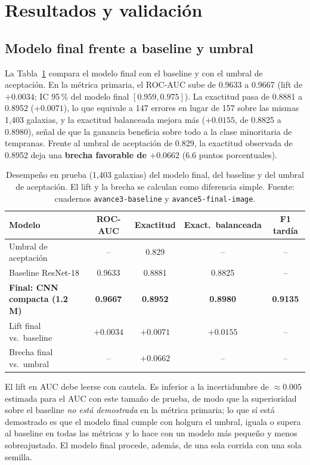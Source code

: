 \documentclass[letterpaper,11pt]{article}
\begin{document}
\section{Resultados y validación}
\label{sec:resultados}

\subsection{Modelo final frente a baseline y umbral}
La Tabla~\ref{tab:final} compara el modelo final con el baseline y con el umbral de aceptación. En la métrica primaria, el ROC-AUC sube de 0.9633 a 0.9667 (lift de $+0.0034$; IC 95\,\% del modelo final $[0.959, 0.975]$). La exactitud pasa de 0.8881 a 0.8952 ($+0.0071$), lo que equivale a 147 errores en lugar de 157 sobre las mismas 1,403 galaxias, y la exactitud balanceada mejora más ($+0.0155$, de 0.8825 a 0.8980), señal de que la ganancia beneficia sobre todo a la clase minoritaria de tempranas. Frente al umbral de aceptación de 0.829, la exactitud observada de 0.8952 deja una \textbf{brecha favorable de $+0.0662$} (6.6 puntos porcentuales).

\begin{table}[H]
  \centering
  \caption{Desempeño en prueba (1,403 galaxias) del modelo final, del baseline y del umbral de aceptación. El lift y la brecha se calculan como diferencia simple. Fuente: cuadernos \texttt{avance3-baseline} y \texttt{avance5-final-image}.}
  \label{tab:final}
  \begin{tabular}{lcccc}
    \toprule
    Modelo & ROC-AUC & Exactitud & Exact.\ balanceada & F1 tardía \\
    \midrule
    Umbral de aceptación & -- & 0.829 & -- & -- \\
    Baseline ResNet-18 & 0.9633 & 0.8881 & 0.8825 & -- \\
    \textbf{Final: CNN compacta (1.2 M)} & \textbf{0.9667} & \textbf{0.8952} & \textbf{0.8980} & \textbf{0.9135} \\
    \midrule
    Lift final vs.\ baseline & $+0.0034$ & $+0.0071$ & $+0.0155$ & -- \\
    Brecha final vs.\ umbral & -- & $+0.0662$ & -- & -- \\
    \bottomrule
  \end{tabular}
\end{table}

El lift en AUC debe leerse con cautela. Es inferior a la incertidumbre de $\approx 0.005$ estimada para el AUC con este tamaño de prueba, de modo que la superioridad sobre el baseline \emph{no está demostrada} en la métrica primaria; lo que sí está demostrado es que el modelo final cumple con holgura el umbral, iguala o supera al baseline en todas las métricas y lo hace con un modelo más pequeño y menos sobreajustado. El modelo final procede, además, de una sola corrida con una sola semilla.
\end{document}
